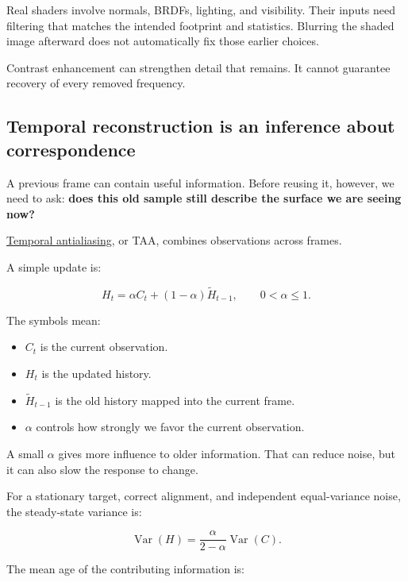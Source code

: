 Real shaders involve normals, BRDFs, lighting, and visibility. Their inputs need filtering that matches the intended footprint and statistics. Blurring the shaded image afterward does not automatically fix those earlier choices.

Contrast enhancement can strengthen detail that remains. It cannot guarantee recovery of every removed frequency.

\subsection{Temporal reconstruction is an inference about correspondence}\label{04-visual-computing-ii-ch042-temporal-reconstruction-is-an-inference-about-correspondence}

\hypertarget{04-visual-computing-ii-ch042-temporal-reconstruction-is-an-inference-about-correspondence}{}

A previous frame can contain useful information. Before reusing it, however, we need to ask: \textbf{does this old sample still describe the surface we are seeing now?}

\hyperref[appendix-0727340a4428]{Temporal antialiasing}, or TAA, combines observations across frames.

A simple update is:

\[
H_t=\alpha C_t+(1-\alpha)\widetilde H_{t-1},
\qquad 0<\alpha\leq1.
\]

The symbols mean:

\begin{itemize}
\tightlist
\item
  \(C_t\) is the current observation.
\item
  \(H_t\) is the updated history.
\item
  \(\widetilde H_{t-1}\) is the old history mapped into the current frame.
\item
  \(\alpha\) controls how strongly we favor the current observation.
\end{itemize}

A small \(\alpha\) gives more influence to older information. That can reduce noise, but it can also slow the response to change.

For a stationary target, correct alignment, and independent equal-variance noise, the steady-state variance is:

\[
\operatorname{Var}(H)
=\frac{\alpha}{2-\alpha}\operatorname{Var}(C).
\]

The mean age of the contributing information is:

